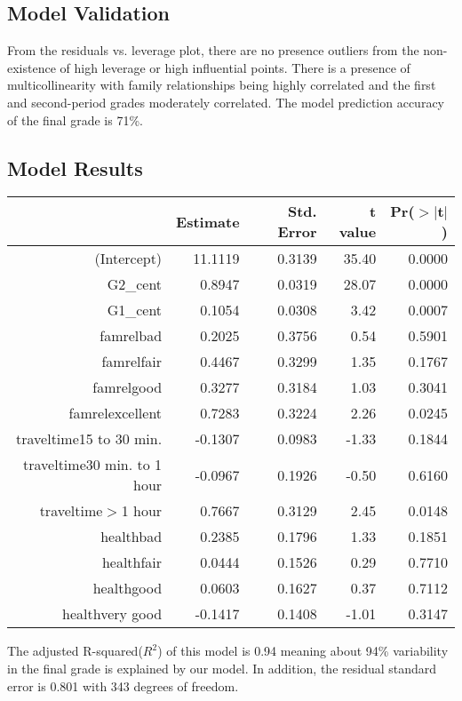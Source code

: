 \documentclass[11pt]{article}
\begin{document}
\subsection{Model Validation}

From the residuals vs. leverage plot, there are no presence outliers from the non-existence of high leverage or high influential points. 
There is a presence of multicollinearity with family relationships being highly correlated and the first and second-period grades moderately correlated.
The model prediction accuracy of the final grade is 71\%.

\subsection{Model Results}
\begin{table}[ht]
\centering
\begin{tabular}{rrrrr}
  \hline
 & Estimate & Std. Error & t value & Pr($>$$|$t$|$) \\ 
  \hline
(Intercept) & 11.1119 & 0.3139 & 35.40 & 0.0000 \\ 
  G2\_cent & 0.8947 & 0.0319 & 28.07 & 0.0000 \\ 
  G1\_cent & 0.1054 & 0.0308 & 3.42 & 0.0007 \\ 
  famrelbad & 0.2025 & 0.3756 & 0.54 & 0.5901 \\ 
  famrelfair & 0.4467 & 0.3299 & 1.35 & 0.1767 \\ 
  famrelgood & 0.3277 & 0.3184 & 1.03 & 0.3041 \\ 
  famrelexcellent & 0.7283 & 0.3224 & 2.26 & 0.0245 \\ 
  traveltime15 to 30 min. & -0.1307 & 0.0983 & -1.33 & 0.1844 \\ 
  traveltime30 min. to 1 hour & -0.0967 & 0.1926 & -0.50 & 0.6160 \\ 
  traveltime$>$1 hour & 0.7667 & 0.3129 & 2.45 & 0.0148 \\ 
  healthbad & 0.2385 & 0.1796 & 1.33 & 0.1851 \\ 
  healthfair & 0.0444 & 0.1526 & 0.29 & 0.7710 \\ 
  healthgood & 0.0603 & 0.1627 & 0.37 & 0.7112 \\ 
  healthvery good & -0.1417 & 0.1408 & -1.01 & 0.3147 \\ 
   \hline
\end{tabular}
\end{table}

The adjusted R-squared($R^2$) of this model is 0.94 meaning about 94\% variability in the final grade is explained by our model. In addition, the residual standard error is 0.801 with 343 degrees of freedom.
\end{document}
